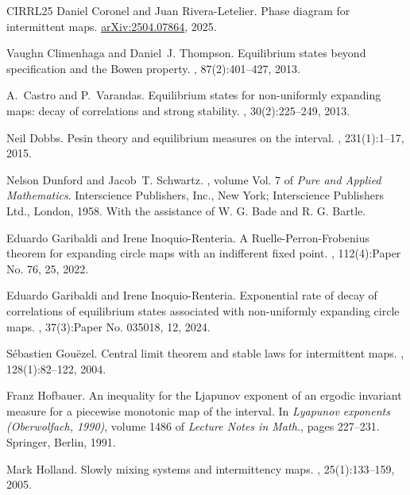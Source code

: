 \documentclass[12pt]{amsart}
\numberwithin{equation}{section} %
\numberwithin{figure}{section} %
\theoremstyle{plain}
\theoremstyle{definition}
\theoremstyle{remark}
\theoremstyle{citing}
\renewcommand{\=}{\coloneqq}
\begin{document}
\begin{thebibliography}{CIRRL25}
Daniel Coronel and Juan Rivera-Letelier.
\newblock Phase diagram for intermittent maps.
\newblock \href{https://arxiv.org/abs/2504.07864} {arXiv:2504.07864}, 2025.

Vaughn Climenhaga and Daniel~J. Thompson.
\newblock Equilibrium states beyond specification and the {B}owen property.
, 87(2):401--427, 2013.

A.~Castro and P.~Varandas.
\newblock Equilibrium states for non-uniformly expanding maps: decay of correlations and strong stability.
, 30(2):225--249, 2013.

Neil Dobbs.
\newblock Pesin theory and equilibrium measures on the interval.
, 231(1):1--17, 2015.

Nelson Dunford and Jacob~T. Schwartz.
, volume Vol. 7 of {\em Pure and Applied Mathematics}.
\newblock Interscience Publishers, Inc., New York; Interscience Publishers Ltd., London, 1958.
\newblock With the assistance of W. G. Bade and R. G. Bartle.

Eduardo Garibaldi and Irene Inoquio-Renteria.
\newblock A {R}uelle-{P}erron-{F}robenius theorem for expanding circle maps with an indifferent fixed point.
, 112(4):Paper No. 76, 25, 2022.

Eduardo Garibaldi and Irene Inoquio-Renteria.
\newblock Exponential rate of decay of correlations of equilibrium states associated with non-uniformly expanding circle maps.
, 37(3):Paper No. 035018, 12, 2024.

S\'ebastien Gou\"ezel.
\newblock Central limit theorem and stable laws for intermittent maps.
, 128(1):82--122, 2004.

Franz Hofbauer.
\newblock An inequality for the {L}japunov exponent of an ergodic invariant measure for a piecewise monotonic map of the interval.
\newblock In {\em Lyapunov exponents ({O}berwolfach, 1990)}, volume 1486 of {\em Lecture Notes in Math.}, pages 227--231. Springer, Berlin, 1991.

Mark Holland.
\newblock Slowly mixing systems and intermittency maps.
, 25(1):133--159, 2005.


\end{thebibliography}
\end{document}
